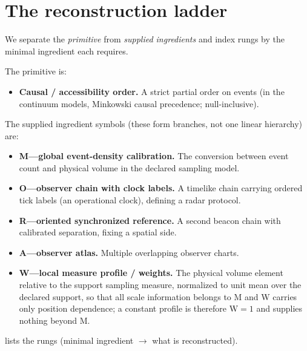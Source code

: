 \section{The reconstruction ladder}\label{sec:ladder}

We separate the \emph{primitive} from \emph{supplied ingredients} and index
rungs by the minimal ingredient each requires.

The primitive is:
\begin{itemize}
\item \textbf{Causal / accessibility order.} A strict partial order on
  events (in the continuum models, Minkowski causal precedence;
  null-inclusive).
\end{itemize}

The supplied ingredient symbols (these form branches, not one linear
hierarchy) are:
\begin{itemize}
\item \textbf{M---global event-density calibration.} The conversion between
  event count and physical volume in the declared sampling model.
\item \textbf{O---observer chain with clock labels.} A timelike chain
  carrying ordered tick labels (an operational clock), defining a radar
  protocol.
\item \textbf{R---oriented synchronized reference.} A second beacon chain
  with calibrated separation, fixing a spatial side.
\item \textbf{A---observer atlas.} Multiple overlapping observer charts.
\item \textbf{W---local measure profile / weights.} The physical volume
  element relative to the support sampling measure, normalized to unit mean
  over the declared support, so that all scale information belongs to M and
  W carries only position dependence; a constant profile is therefore
  $\mathrm{W} = 1$ and supplies nothing beyond M.
\end{itemize}

 lists the rungs (minimal ingredient $\to$ what is
reconstructed).

